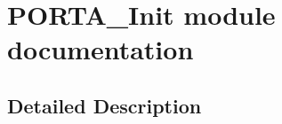 \hypertarget{group___p_o_r_t_a___init__module}{}\section{P\+O\+R\+T\+A\+\_\+\+Init module documentation}
\label{group___p_o_r_t_a___init__module}


\subsection{Detailed Description}
